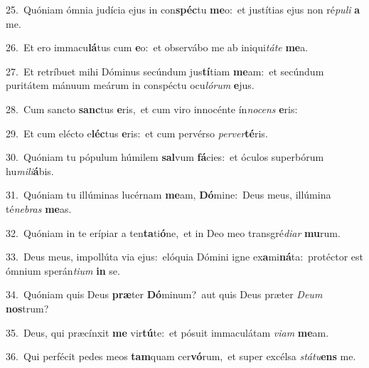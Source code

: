 {\numbfont\textcolor{\numbcolor}{25.}}~Quóniam ómnia judícia ejus in con\-\textbf{spéc}\-tu \textbf{me}\-o:~\star et justítias ejus non ré\-\textit{pu}\-\textit{li} \textbf{a} me.\par
{\numbfont\textcolor{\numbcolor}{26.}}~Et ero immacu\-\textbf{lá}\-tus cum \textbf{e}\-o:~\star et observábo me ab iniqui\-\textit{tá}\-\textit{te} \textbf{me}\-a.\par
{\numbfont\textcolor{\numbcolor}{27.}}~Et retríbuet mihi Dóminus secúndum jus\-\textbf{tí}\-tiam \textbf{me}\-am:~\star et secúndum puritátem mánuum meárum in conspéctu ocu\-\textit{ló}\-\textit{rum} \textbf{e}\-jus.\par
{\numbfont\textcolor{\numbcolor}{28.}}~Cum sancto \textbf{sanc}\-tus \textbf{e}\-ris,~\star et cum viro innocénte ín\-\textit{no}\-\textit{cens} \textbf{e}\-ris:\par
{\numbfont\textcolor{\numbcolor}{29.}}~Et cum elécto e\-\textbf{léc}\-tus \textbf{e}\-ris:~\star et cum pervérso \textit{per}\-\textit{ver}\textbf{té}ris.\par
{\numbfont\textcolor{\numbcolor}{30.}}~Quóniam tu pópulum húmilem \textbf{sal}\-vum \textbf{fá}\-cies:~\star et óculos superbórum hu\-\textit{mi}\-\textit{li}\textbf{á}bis.\par
{\numbfont\textcolor{\numbcolor}{31.}}~Quóniam tu illúminas lucérnam \textbf{me}\-am, \textbf{Dó}\-mine:~\star Deus meus, illúmina té\-\textit{ne}\-\textit{bras} \textbf{me}\-as.\par
{\numbfont\textcolor{\numbcolor}{32.}}~Quóniam in te erípiar a ten\-\textbf{ta}\-ti\-\textbf{ó}\-ne,~\star et in Deo meo transgré\-\textit{di}\-\textit{ar} \textbf{mu}\-rum.\par
{\numbfont\textcolor{\numbcolor}{33.}}~Deus meus, impollúta via ejus:~\dagger elóquia Dómini igne ex\-\textbf{a}\-mi\-\textbf{ná}\-ta:~\star protéctor est ómnium sperán\-\textit{ti}\-\textit{um} \textbf{in} se.\par
{\numbfont\textcolor{\numbcolor}{34.}}~Quóniam quis Deus \textbf{præ}\-ter \textbf{Dó}\-minum?~\star aut quis Deus præter \textit{De}\-\textit{um} \textbf{nos}\-trum?\par
{\numbfont\textcolor{\numbcolor}{35.}}~Deus, qui præcínxit \textbf{me} vir\-\textbf{tú}\-te:~\star et pósuit immaculátam \textit{vi}\-\textit{am} \textbf{me}\-am.\par
{\numbfont\textcolor{\numbcolor}{36.}}~Qui perfécit pedes meos \textbf{tam}\-quam cer\-\textbf{vó}\-rum,~\star et super excélsa \textit{stá}\-\textit{tu}\textbf{ens} me.\par
